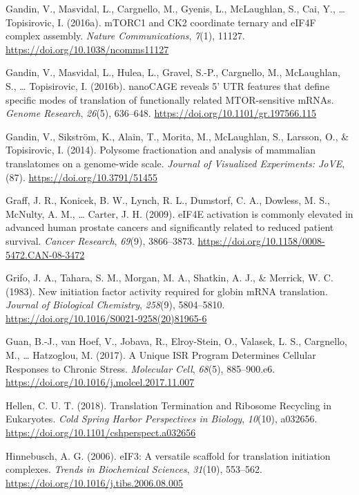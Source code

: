 \documentclass[12pt,openany]{book}
\begin{document}
\hypertarget{ref-Gandin2016}{}
Gandin, V., Masvidal, L., Cargnello, M., Gyenis, L., McLaughlan, S.,
Cai, Y., \ldots{} Topisirovic, I. (2016a). mTORC1 and CK2 coordinate
ternary and eIF4F complex assembly. \emph{Nature Communications},
\emph{7}(1), 11127. \url{https://doi.org/10.1038/ncomms11127}

\hypertarget{ref-Gandin2016a}{}
Gandin, V., Masvidal, L., Hulea, L., Gravel, S.-P., Cargnello, M.,
McLaughlan, S., \ldots{} Topisirovic, I. (2016b). nanoCAGE reveals 5'
UTR features that define specific modes of translation of functionally
related MTOR-sensitive mRNAs. \emph{Genome Research}, \emph{26}(5),
636--648. \url{https://doi.org/10.1101/gr.197566.115}

\hypertarget{ref-Gandin2014}{}
Gandin, V., Sikström, K., Alain, T., Morita, M., McLaughlan, S.,
Larsson, O., \& Topisirovic, I. (2014). Polysome fractionation and
analysis of mammalian translatomes on a genome-wide scale. \emph{Journal
of Visualized Experiments: JoVE}, (87).
\url{https://doi.org/10.3791/51455}

\hypertarget{ref-Graff2009}{}
Graff, J. R., Konicek, B. W., Lynch, R. L., Dumstorf, C. A., Dowless, M.
S., McNulty, A. M., \ldots{} Carter, J. H. (2009). eIF4E activation is
commonly elevated in advanced human prostate cancers and significantly
related to reduced patient survival. \emph{Cancer Research},
\emph{69}(9), 3866--3873.
\url{https://doi.org/10.1158/0008-5472.CAN-08-3472}

\hypertarget{ref-Grifo1983}{}
Grifo, J. A., Tahara, S. M., Morgan, M. A., Shatkin, A. J., \& Merrick,
W. C. (1983). New initiation factor activity required for globin mRNA
translation. \emph{Journal of Biological Chemistry}, \emph{258}(9),
5804--5810. \url{https://doi.org/10.1016/S0021-9258(20)81965-6}

\hypertarget{ref-Guan2017}{}
Guan, B.-J., van Hoef, V., Jobava, R., Elroy-Stein, O., Valasek, L. S.,
Cargnello, M., \ldots{} Hatzoglou, M. (2017). A Unique ISR Program
Determines Cellular Responses to Chronic Stress. \emph{Molecular Cell},
\emph{68}(5), 885--900.e6.
\url{https://doi.org/10.1016/j.molcel.2017.11.007}

\hypertarget{ref-Hellen2018}{}
Hellen, C. U. T. (2018). Translation Termination and Ribosome Recycling
in Eukaryotes. \emph{Cold Spring Harbor Perspectives in Biology},
\emph{10}(10), a032656.
\url{https://doi.org/10.1101/cshperspect.a032656}

\hypertarget{ref-Hinnebusch2006}{}
Hinnebusch, A. G. (2006). eIF3: A versatile scaffold for translation
initiation complexes. \emph{Trends in Biochemical Sciences},
\emph{31}(10), 553--562.
\url{https://doi.org/10.1016/j.tibs.2006.08.005}
\end{document}
